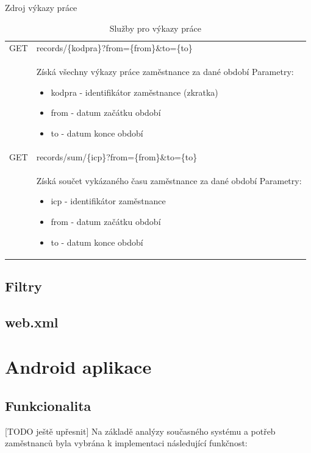 \documentclass{diplomka}
\begin{document}
Zdroj výkazy práce
\begin{table}[H]
\begin{center}
\begin{tabular}{| m{2cm} |  m{10cm} |}
\hline
\rowcolor{Gray}
GET  &records/\{kodpra\}?from=\{from\}\&to=\{to\} \\ 
&  \parbox{10cm}{Získá všechny výkazy práce zaměstnance za dané období\\
Parametry:\begin{itemize}[noitemsep,nolistsep]
\item kodpra - identifikátor zaměstnance (zkratka)
\item from - datum začátku období
\item to - datum konce období
\end{itemize}} \\ \hline
{}
GET & records/sum/\{icp\}?from=\{from\}\&to=\{to\} \\ \hline
&  \parbox{10cm}{Získá součet vykázaného času zaměstnance za dané období\\
Parametry:\begin{itemize}[noitemsep,nolistsep]
\item icp - identifikátor zaměstnance
\item from - datum začátku období
\item to - datum konce období
\end{itemize}} \\ \hline
\end{tabular}
\end{center}
\caption{Služby pro výkazy práce}
\label{tab:urirecords}
\end{table}

\section{Filtry}

\section{web.xml}

\chapter{Android aplikace}

\section{Funkcionalita}
[TODO ještě upřesnit]
Na základě analýzy současného systému a potřeb zaměstnanců byla vybrána k implementaci následující funkčnost: 
\end{document}
